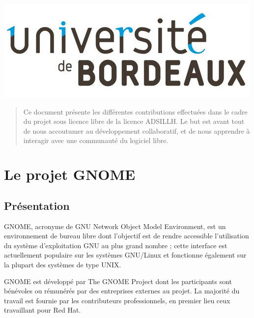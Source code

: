 \documentclass[12pt]{report}
\begin{document}
\begin{titlepage}
  \vspace{-0.1cm}
  \centering\includegraphics[scale=0.3]{images/logo_univ.jpg}
  
\end{titlepage}
\makeatother



\begin{abstract}
Ce document présente les différentes contributions effectuées dans le
cadre du projet sous licence libre de la licence ADSILLH. Le but est
avant tout de nous accoutumer au développement collaboratif, et de
nous apprendre à interagir avec une communauté du logiciel libre.
\end{abstract}

\tableofcontents

\chapter{Le projet GNOME}
\section{Présentation}
GNOME, acronyme de GNU Network Object Model Environment, est un
environnement de bureau libre  dont l'objectif est de rendre
accessible l'utilisation du système d'exploitation GNU au plus grand
nombre ; cette interface est actuellement populaire sur les systèmes
GNU/Linux et fonctionne également sur la plupart des systèmes de type
UNIX.

GNOME est développé par The GNOME Project dont les participants sont
bénévoles ou rémunérés par des entreprises externes au projet. La
majorité du travail est fournie par les contributeurs professionnels,
en premier lieu ceux travaillant pour Red Hat.
\end{document}
